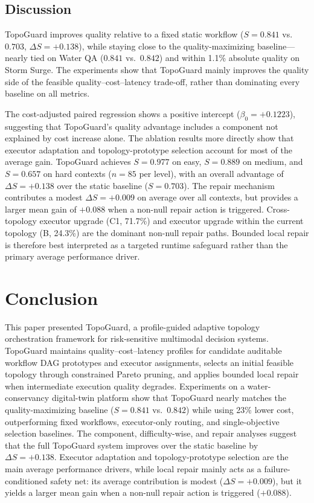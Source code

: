 \documentclass[manuscript,review,anonymous]{acmart}
\begin{document}
\subsection{Discussion}
\label{subsec:discussion}

TopoGuard improves quality relative to a fixed static workflow ($S=0.841$ vs.\ $0.703$, $\Delta S=+0.138$), while staying close to the quality-maximizing baseline---nearly tied on Water QA ($0.841$ vs.\ $0.842$) and within 1.1\% absolute quality on Storm Surge. The experiments show that TopoGuard mainly improves the quality side of the feasible quality--cost--latency trade-off, rather than dominating every baseline on all metrics.

The cost-adjusted paired regression shows a positive intercept ($\beta_0=+0.1223$), suggesting that TopoGuard's quality advantage includes a component not explained by cost increase alone. The ablation results more directly show that executor adaptation and topology-prototype selection account for most of the average gain. TopoGuard achieves $S=0.977$ on easy, $S=0.889$ on medium, and $S=0.657$ on hard contexts ($n=85$ per level), with an overall advantage of $\Delta S=+0.138$ over the static baseline ($S=0.703$). The repair mechanism contributes a modest $\Delta S=+0.009$ on average over all contexts, but provides a larger mean gain of $+0.088$ when a non-null repair action is triggered. Cross-topology executor upgrade (C1, 71.7\%) and executor upgrade within the current topology (B, 24.3\%) are the dominant non-null repair paths. Bounded local repair is therefore best interpreted as a targeted runtime safeguard rather than the primary average performance driver.

\section{Conclusion}
\label{sec:conclusion}

This paper presented TopoGuard, a profile-guided adaptive topology orchestration framework for risk-sensitive multimodal decision systems. TopoGuard maintains quality--cost--latency profiles for candidate auditable workflow DAG prototypes and executor assignments, selects an initial feasible topology through constrained Pareto pruning, and applies bounded local repair when intermediate execution quality degrades. Experiments on a water-conservancy digital-twin platform show that TopoGuard nearly matches the quality-maximizing baseline ($S=0.841$ vs.\ $0.842$) while using 23\% lower cost, outperforming fixed workflows, executor-only routing, and single-objective selection baselines. The component, difficulty-wise, and repair analyses suggest that the full TopoGuard system improves over the static baseline by $\Delta S=+0.138$. Executor adaptation and topology-prototype selection are the main average performance drivers, while local repair mainly acts as a failure-conditioned safety net: its average contribution is modest ($\Delta S=+0.009$), but it yields a larger mean gain when a non-null repair action is triggered ($+0.088$).


\clearpage
\newpage


\end{document}
